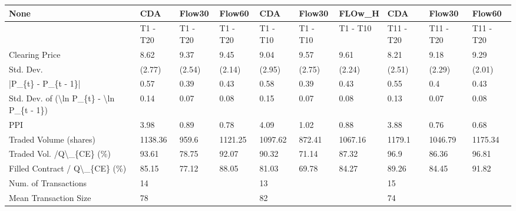 \begin{tabular}{llllllllll}
\hline
 None                                                      & CDA      & Flow30    & Flow60    & CDA      & Flow30    & FLOw\_H   & CDA       & Flow30     & Flow60     \\
\hline
                                                           & T1 - T20 & T1 - T20 & T1 - T20 & T1 - T10 & T1 - T10 & T1 - T10 & T11 - T20 & T11 - T20 & T11 - T20 \\
 Clearing Price                                            & 8.62     & 9.37     & 9.45     & 9.04     & 9.57     & 9.61     & 8.21      & 9.18      & 9.29      \\
 Std. Dev.                                                 & (2.77)   & (2.54)   & (2.14)   & (2.95)   & (2.75)   & (2.24)   & (2.51)    & (2.29)    & (2.01)    \\
 |P\_\{t\} - P\_\{t - 1\}|                                       & 0.57     & 0.39     & 0.43     & 0.58     & 0.39     & 0.43     & 0.55      & 0.4       & 0.43      \\
 Std. Dev. of (\textbackslash{}ln P\_\{t\} - \textbackslash{}ln P\_\{t - 1\})                  & 0.14     & 0.07     & 0.08     & 0.15     & 0.07     & 0.08     & 0.13      & 0.07      & 0.08      \\
 PPI                                                       & 3.98     & 0.89     & 0.78     & 4.09     & 1.02     & 0.88     & 3.88      & 0.76      & 0.68      \\
 Traded Volume (shares)                                    & 1138.36  & 959.6    & 1121.25  & 1097.62  & 872.41   & 1067.16  & 1179.1    & 1046.79   & 1175.34   \\
 Traded Vol. /Q\textbackslash{}\_\{CE\} (\%)                                  & 93.61    & 78.75    & 92.07    & 90.32    & 71.14    & 87.32    & 96.9      & 86.36     & 96.81     \\
 Filled Contract / Q\textbackslash{}\_\{CE\} (\%)                             & 85.15    & 77.12    & 88.05    & 81.03    & 69.78    & 84.27    & 89.26     & 84.45     & 91.82     \\
 Num. of Transactions                                      & 14       &          &          & 13       &          &          & 15        &           &           \\
 Mean Transaction Size                                     & 78       &          &          & 82       &          &          & 74        &           &           \\

\end{tabular}
